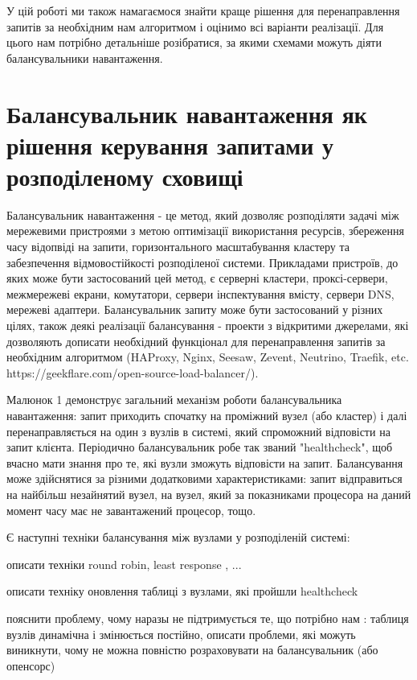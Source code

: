 \documentclass[14pt]{vakthesis}
\begin{document}
У цій роботі ми також намагаємося знайти краще рішення для перенаправлення запитів за необхідним нам алгоритмом і оцінимо всі варіанти реалізації. Для цього нам потрібно детальніше розібратися, за якими схемами можуть діяти балансувальники навантаження.



\section{Балансувальник навантаження як рішення керування запитами у розподіленому сховищі}

Балансувальник навантаження - це метод, який дозволяє розподіляти задачі між мережевими пристроями з метою оптимізації використання ресурсів, збереження часу відопвіді на запити, горизонтального масштабування кластеру та забезпечення відмовостійкості розподіленої системи. Прикладами пристроїв, до яких може бути застосований цей метод, є серверні кластери, проксі-сервери, межмережеві екрани, комутатори, сервери інспектування вмісту, сервери DNS, мережеві адаптери. Балансувальник запиту може бути застосований у різних цілях, також деякі реалізації балансування - проекти з відкритими джерелами, які дозволяють дописати необхідний функціонал для перенаправлення запитів за необхідним алгоритмом (HAProxy, Nginx, Seesaw, Zevent, Neutrino, Traefik, etc. https://geekflare.com/open-source-load-balancer/).


Малюнок 1 демонструє загальний механізм роботи  балансувальника навантаження: запит приходить спочатку на проміжний вузел (або кластер) і далі  перенаправляється на один з вузлів в системі, який спроможний відповісти на запит клієнта. Періодично балансувальник робе так званий "healthcheck", щоб вчасно мати знання про те, які вузли зможуть відповісти на запит.
Балансування може здійснятися за різними додатковими характеристиками: запит відправиться на найбільш незайнятий вузел, на вузел, який за показниками процесора на даний момент часу має не завантажений процесор, тощо.

Є наступні техніки балансування між вузлами у розподіленій системі:

описати техніки round robin, least response , ...

описати техніку оновлення таблиці з вузлами, які пройшли healthcheck

пояснити проблему, чому наразы не підтримується те, що потрібно нам : таблиця вузлів динамічна і змінюється постійно, описати проблеми, які можуть виникнути, чому не можна повністю розраховувати на балансувальник (або опенсорс)
\end{document}
